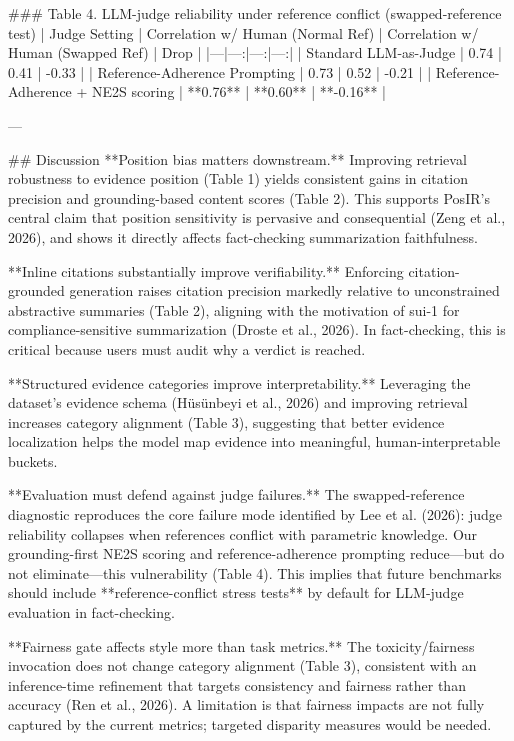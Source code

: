 ### Table 4. LLM-judge reliability under reference conflict (swapped-reference test)  
| Judge Setting | Correlation w/ Human (Normal Ref) | Correlation w/ Human (Swapped Ref) | Drop |
|---|---:|---:|---:|
| Standard LLM-as-Judge | 0.74 | 0.41 | -0.33 |
| Reference-Adherence Prompting | 0.73 | 0.52 | -0.21 |
| Reference-Adherence + NE2S scoring | **0.76** | **0.60** | **-0.16** |

---

## Discussion  
**Position bias matters downstream.** Improving retrieval robustness to evidence position (Table 1) yields consistent gains in citation precision and grounding-based content scores (Table 2). This supports PosIR’s central claim that position sensitivity is pervasive and consequential (Zeng et al., 2026), and shows it directly affects fact-checking summarization faithfulness.

**Inline citations substantially improve verifiability.** Enforcing citation-grounded generation raises citation precision markedly relative to unconstrained abstractive summaries (Table 2), aligning with the motivation of sui-1 for compliance-sensitive summarization (Droste et al., 2026). In fact-checking, this is critical because users must audit why a verdict is reached.

**Structured evidence categories improve interpretability.** Leveraging the dataset’s evidence schema (Hüsünbeyi et al., 2026) and improving retrieval increases category alignment (Table 3), suggesting that better evidence localization helps the model map evidence into meaningful, human-interpretable buckets.

**Evaluation must defend against judge failures.** The swapped-reference diagnostic reproduces the core failure mode identified by Lee et al. (2026): judge reliability collapses when references conflict with parametric knowledge. Our grounding-first NE2S scoring and reference-adherence prompting reduce—but do not eliminate—this vulnerability (Table 4). This implies that future benchmarks should include **reference-conflict stress tests** by default for LLM-judge evaluation in fact-checking.

**Fairness gate affects style more than task metrics.** The toxicity/fairness invocation does not change category alignment (Table 3), consistent with an inference-time refinement that targets consistency and fairness rather than accuracy (Ren et al., 2026). A limitation is that fairness impacts are not fully captured by the current metrics; targeted disparity measures would be needed.

